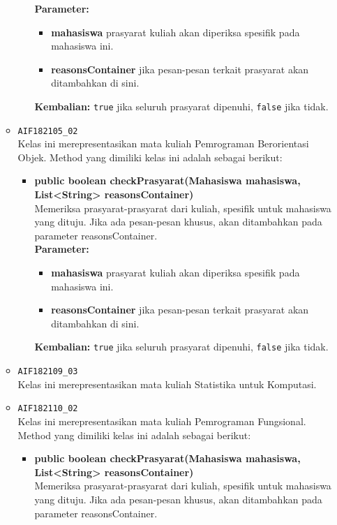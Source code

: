 \begin{enumerate}
\begin{itemize}
\begin{itemize}
			\textbf{Parameter:}
			\begin{itemize}
				\item \textbf{mahasiswa} prasyarat kuliah akan diperiksa spesifik pada mahasiswa ini.
				\item \textbf{reasonsContainer} jika pesan-pesan terkait prasyarat akan ditambahkan di sini.
			\end{itemize}
			\textbf{Kembalian:} \texttt{true} jika seluruh prasyarat dipenuhi, \texttt{false} jika tidak.
		\end{itemize}
		\item \texttt{AIF182105\_02} \\
		Kelas ini merepresentasikan mata kuliah Pemrograman Berorientasi Objek. Method yang dimiliki kelas ini adalah sebagai berikut: 
		\begin{itemize}
			\item \textbf{public boolean checkPrasyarat(Mahasiswa mahasiswa, List<String> reasonsContainer)}\\
			Memeriksa prasyarat-prasyarat dari kuliah, spesifik untuk mahasiswa yang dituju. Jika ada pesan-pesan khusus, akan ditambahkan pada parameter reasonsContainer.\\
			\textbf{Parameter:}
			\begin{itemize}
				\item \textbf{mahasiswa} prasyarat kuliah akan diperiksa spesifik pada mahasiswa ini.
				\item \textbf{reasonsContainer} jika pesan-pesan terkait prasyarat akan ditambahkan di sini.
			\end{itemize}
			\textbf{Kembalian:} \texttt{true} jika seluruh prasyarat dipenuhi, \texttt{false} jika tidak.
		\end{itemize}
		\item \texttt{AIF182109\_03} \\
		Kelas ini merepresentasikan mata kuliah Statistika untuk Komputasi.
		\item \texttt{AIF182110\_02} \\
		Kelas ini merepresentasikan mata kuliah Pemrograman Fungsional. Method yang dimiliki kelas ini adalah sebagai berikut: 
		\begin{itemize}
			\item \textbf{public boolean checkPrasyarat(Mahasiswa mahasiswa, List<String> reasonsContainer)}\\
			Memeriksa prasyarat-prasyarat dari kuliah, spesifik untuk mahasiswa yang dituju. Jika ada pesan-pesan khusus, akan ditambahkan pada parameter reasonsContainer.\\

\end{itemize}
\end{itemize}
\end{enumerate}
